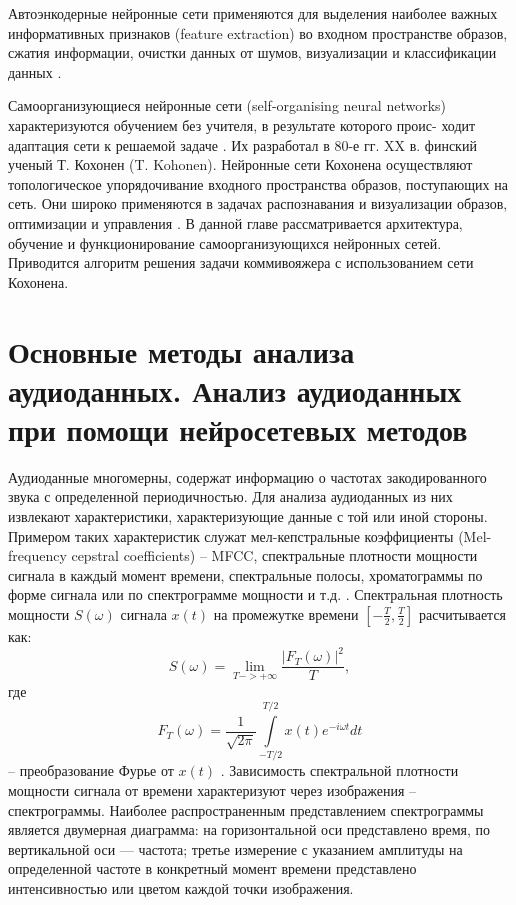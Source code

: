 Автоэнкодерные нейронные сети применяются для выделения наиболее важных информативных признаков 
(feature extraction) во входном пространстве образов, сжатия информации, очистки
данных от шумов, визуализации и классификации данных \cite{bgu_krasn}.

Самоорганизующиеся нейронные сети (self-organising neural networks)
характеризуются обучением без учителя, в результате которого проис-
ходит адаптация сети к решаемой задаче . Их разработал в 80-е гг. XX в.
финский ученый Т. Кохонен (T. Kohonen). Нейронные сети
Кохонена осуществляют топологическое упорядочивание входного
пространства образов, поступающих на сеть. Они широко применяются
в задачах распознавания и визуализации образов, оптимизации и
управления . В данной главе рассматривается архитектура, обучение и
функционирование самоорганизующихся нейронных сетей. Приводится алгоритм решения задачи коммивояжера с использованием сети Кохонена.

\chapter{Основные методы анализа аудиоданных. Анализ аудиоданных при помощи нейросетевых методов}
Аудиоданные многомерны, содержат информацию о частотах закодированного звука с 
определенной периодичностью. 
Для анализа аудиоданных из них извлекают характеристики, характеризующие данные с той или иной стороны.
Примером таких характеристик служат мел-кепстральные коэффициенты (Mel-frequency cepstral coefficients) -- MFCC,
спектральные плотности мощности сигнала в каждый момент времени, 
спектральные полосы, хроматограммы по форме сигнала или по спектрограмме мощности и т.д. \cite{mus_zhao}.
Спектральная плотность мощности $S(\omega)$ сигнала $x(t)$ на промежутке времени $\left[-\frac{T}{2},\frac{T}{2}\right]$ расчитывается как:
\begin{equation}
	S(\omega) = \lim_{T->+\infty} \frac{\left|F_T(\omega)\right|^2}{T},
\end{equation}
где
\begin{equation}
	F_{T}(\omega )={\frac {1}{\sqrt {2\pi }}}\int \limits _{-T/2}^{T/2}x(t)e^{-i\omega t} dt
\end{equation}
-- преобразование Фурье	от $x(t)$ \cite{otnes}.
Зависимость спектральной плотности мощности сигнала от времени характеризуют через изображения -- спектрограммы.
Наиболее распространенным представлением спектрограммы является двумерная диаграмма: на горизонтальной оси представлено время, 
по вертикальной оси — частота; третье измерение с указанием амплитуды на определенной частоте в конкретный момент времени представлено 
интенсивностью или цветом каждой точки изображения.

